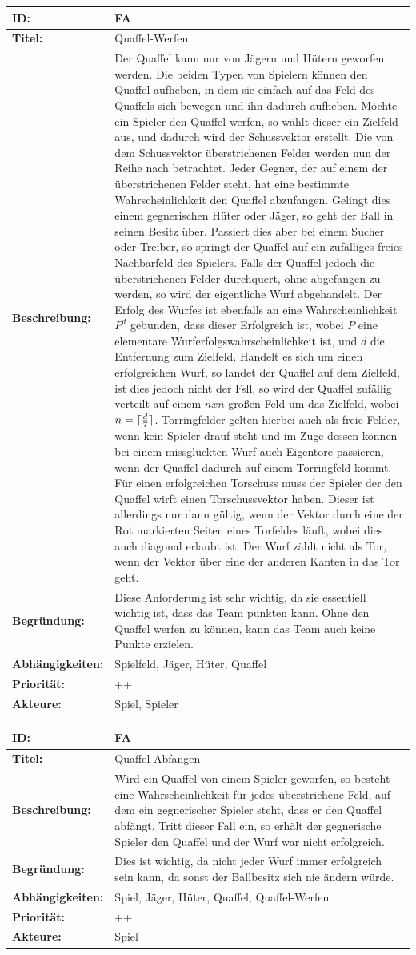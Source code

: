 \documentclass[a4paper,12pt,
headsepline,           %
oneside,               %
pointlessnumbers,      %
bibtotoc,              %
]{scrartcl}
\DeclarePairedDelimiter{\ceil}{\lceil}{\rceil}
\newcommand{\anf}[7] {
    \begin{table}[H]
        \centering
        \begin{tabular}{|p{3.2cm}|p{11.3cm}|}
        	\hline
            \textbf{ID:} & \textbf{#1} \\ \hline
            \textbf{Titel:} & #2 \\ \hline
            \textbf{Beschreibung:} & #3 \\ \hline
            \textbf{Begründung:} & #4 \\ \hline
            \textbf{Abhängigkeiten:} & #5 \\ \hline
            \textbf{Priorität:} & #6 \\ \hline
            \textbf{Akteure:} & #7 \\ \hline
        \end{tabular}
    \end{table}
}
\newcounter{fanfCount}
\newcommand{\fanf}[6] {
    \stepcounter{fanfCount}
    \anf{FA\thefanfCount}{#1}{#2}{#3}{#4}{#5}{#6}
}
\begin{document}
	\fanf	{Quaffel-Werfen}
			{Der Quaffel kann nur von Jägern und Hütern geworfen werden. Die beiden Typen von Spielern können den Quaffel aufheben, in dem sie einfach auf das Feld des Quaffels sich bewegen und ihn dadurch aufheben. Möchte ein Spieler den Quaffel werfen, so wählt dieser ein Zielfeld aus, und dadurch wird der Schussvektor erstellt. Die von dem Schussvektor überstrichenen Felder werden nun der Reihe nach betrachtet. Jeder Gegner, der auf einem der überstrichenen Felder steht, hat eine bestimmte Wahrscheinlichkeit den Quaffel abzufangen. Gelingt dies einem gegnerischen Hüter oder Jäger, so geht der Ball in seinen Besitz über. Passiert dies aber bei einem Sucher oder Treiber, so springt der Quaffel auf ein zufälliges freies Nachbarfeld des Spielers. 
			Falls der Quaffel jedoch die überstrichenen Felder durchquert, ohne abgefangen zu werden, so wird der eigentliche Wurf abgehandelt. Der Erfolg des Wurfes ist ebenfalls an eine Wahrscheinlichkeit $P^{d}$ gebunden, dass dieser Erfolgreich ist, wobei $P$ eine elementare Wurferfolgswahrscheinlichkeit ist, und $d$ die Entfernung zum Zielfeld. Handelt es sich um einen erfolgreichen Wurf, so landet der Quaffel auf dem Zielfeld, ist dies jedoch nicht der Fsll, so wird der Quaffel zufällig verteilt auf einem $n x n$ großen Feld um das Zielfeld, wobei $n = \ceil{\frac{d}{7}}$. Torringfelder gelten hierbei auch als freie Felder, wenn kein Spieler drauf steht und im Zuge dessen können bei einem missglückten Wurf auch Eigentore passieren, wenn der Quaffel dadurch auf einem Torringfeld kommt. 
			Für einen erfolgreichen Torschuss muss der Spieler der den Quaffel wirft einen Torschussvektor haben. Dieser ist allerdings nur dann gültig, wenn der Vektor durch eine der Rot markierten Seiten eines Torfeldes läuft, wobei dies auch diagonal erlaubt ist. Der Wurf zählt nicht als Tor, wenn der Vektor über eine der anderen Kanten in das Tor geht.} 
			{Diese Anforderung ist sehr wichtig, da sie essentiell wichtig ist, dass das Team punkten kann. Ohne den Quaffel werfen zu können, kann das Team auch keine Punkte erzielen.}			
			{Spielfeld, Jäger, Hüter, Quaffel}
			{++}
			{Spiel, Spieler}
			
	\fanf	{Quaffel Abfangen}
			{Wird ein Quaffel von einem Spieler geworfen, so besteht eine Wahrscheinlichkeit für jedes überstrichene Feld, auf dem ein gegnerischer Spieler steht, dass er den Quaffel abfängt. Tritt dieser Fall ein, so erhält der gegnerische Spieler den Quaffel und der Wurf war nicht erfolgreich.}
			{Dies ist wichtig, da nicht jeder Wurf immer erfolgreich sein kann, da sonst der Ballbesitz sich nie ändern würde.}
			{Spiel, Jäger, Hüter, Quaffel, Quaffel-Werfen}
			{++}
			{Spiel}
			
\end{document}
